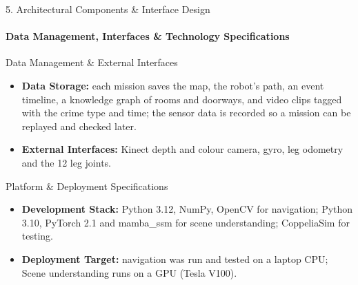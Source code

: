 \documentclass[aspectratio=169, 11pt]{beamer}
\begin{document}
\begin{frame}{5. Architectural Components \& Interface Design}
    \framesubtitle{Data Management, Interfaces \& Technology Specifications}
    \begin{block}{Data Management \& External Interfaces}
        \small
        \begin{itemize}
            \item \textbf{Data Storage:} each mission saves the map, the robot's path, an event timeline, a knowledge graph of rooms and doorways, and video clips tagged with the crime type and time; the sensor data is recorded so a mission can be replayed and checked later.
            \item \textbf{External Interfaces:} Kinect depth and colour camera, gyro, leg odometry and the 12 leg joints.
        \end{itemize}
    \end{block}

    \begin{block}{Platform \& Deployment Specifications}
        \small
        \begin{itemize}
            \item \textbf{Development Stack:} Python 3.12, NumPy, OpenCV for navigation; Python 3.10, PyTorch 2.1 and mamba\_ssm for scene understanding; CoppeliaSim for testing.
            \item \textbf{Deployment Target:} navigation was run and tested on a laptop CPU; Scene understanding runs on a GPU (Tesla V100).
        \end{itemize}
    \end{block}
\end{frame}
\end{document}
